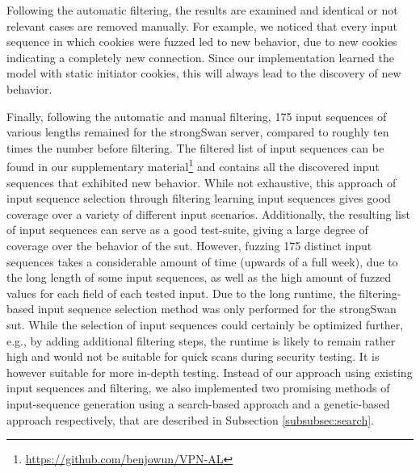 Following the automatic filtering, the results are examined and identical or not relevant cases are removed manually. For example, we noticed that every input sequence in which cookies were fuzzed led to new behavior, due to new cookies indicating a completely new connection. Since our implementation learned the model with static initiator cookies, this will always lead to the discovery of new behavior. 

Finally, following the automatic and manual filtering, 175 input sequences of various lengths remained for the strongSwan server, compared to roughly ten times the number before filtering. The filtered list of input sequences can be found in our supplementary material\footnote{\url{https://github.com/benjowun/VPN-AL}} and contains all the discovered input sequences that exhibited new behavior. While not exhaustive, this approach of input sequence selection through filtering learning input sequences gives good coverage over a variety of different input scenarios. Additionally, the resulting list of input sequences can serve as a good test-suite, giving a large degree of coverage over the behavior of the \ac{sut}. However, fuzzing 175 distinct input sequences takes a considerable amount of time (upwards of a full week), due to the long length of some input sequences, as well as the high amount of fuzzed values for each field of each tested input. Due to the long runtime, the filtering-based input sequence selection method was only performed for the strongSwan \ac{sut}. While the selection of input sequences could certainly be optimized further, e.g., by adding additional filtering steps, the runtime is likely to remain rather high and would not be suitable for quick scans during security testing. It is however suitable for more in-depth testing. Instead of our approach using existing input sequences and filtering, we also implemented two promising methods of input-sequence generation using a search-based approach and a genetic-based approach respectively, that are described in Subsection \ref{subsubsec:search}.

